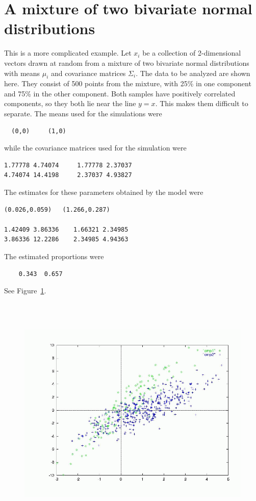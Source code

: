 \section{A mixture of two bivariate normal distributions}

This is a more complicated example.
Let $x_i$ be a collection of 2-dimensional vectors drawn  
at random from a mixture of two bivariate normal distributions with
means $\mu_i$ and covariance matrices $\Sigma_i$.
The data to be analyzed are shown here. They consist of 500
points from the mixture, with 25\% in one component and 75\% in the other
component. Both samples have positively correlated components, so
they both lie near the line $y=x$.
This makes them difficult to separate.
The means used for the simulations were
\begin{lstlisting}
  (0,0)     (1,0)
\end{lstlisting}
while the covariance matrices used for the simulation were
\begin{lstlisting}
1.77778 4.74074     1.77778 2.37037
4.74074 14.4198     2.37037 4.93827
\end{lstlisting}
The estimates for these parameters obtained by the model were
\begin{lstlisting}
(0.026,0.059)   (1.266,0.287)

1.42409 3.86336    1.66321 2.34985
3.86336 12.2286    2.34985 4.94363
\end{lstlisting}

The estimated proportions were
\begin{lstlisting}
    0.343  0.657
\end{lstlisting}
See Figure~\ref{fig:estimatedprop}.
\begin{figure}[htbp]
  \includegraphics[height=4.5in, width=\textwidth]{datax.png}
  \emptycaption
  \label{fig:estimatedprop}
\end{figure}

